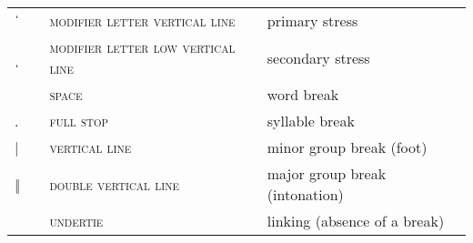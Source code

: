 \label{tab:ipa_boundaries}
 \tablelasttail{\bottomrule}

\begin{center}
\begin{xtabular}{ l L{1.2cm} L{5.4cm} L{4cm} }
{\large ˈ} &  & \textsc{modifier letter vertical line} & primary stress \\
{\large ˌ} &  & \textsc{modifier letter low vertical line} & secondary stress \\
 &  & \textsc{space} & word break \\
{\large.} &  & \textsc{full stop} & syllable break \\
{|} &  & \textsc{vertical line} & minor group break (foot) \\
{‖} &  & \textsc{double vertical line} & major group break (intonation) \\
 &  & \textsc{undertie} & linking (absence of a break) \\
\end{xtabular}
\end{center}